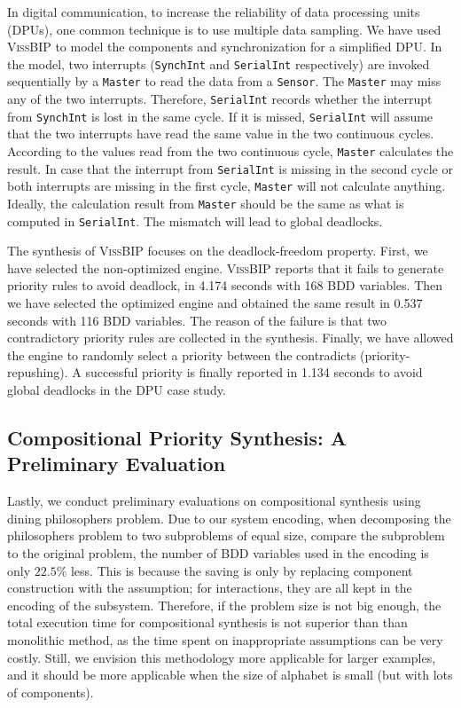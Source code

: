 \documentclass[10pt, a4paper, onecolumn, conference, compsocconf]{IEEEtran}
\begin{document}
In digital communication, to increase the reliability of data processing units (DPUs), one common technique is to use multiple data sampling.
We have used \textsc{VissBIP} to model the components and synchronization for a simplified DPU. In the model, two interrupts (\texttt{SynchInt} and \texttt{SerialInt} respectively) are invoked sequentially by a \texttt{Master} to read the data from a \texttt{Sensor}. The \texttt{Master} may miss any of the two interrupts. Therefore, \texttt{SerialInt} records whether the interrupt from \texttt{SynchInt} is lost in the same cycle. If it is missed, \texttt{SerialInt} will assume that the two interrupts have read the same value in the two continuous cycles. According to the values read from the two continuous cycle, \texttt{Master} calculates the result. In case that the interrupt from \texttt{SerialInt} is missing in the second cycle or both interrupts are missing in the first cycle, \texttt{Master} will not calculate anything. Ideally, the calculation result from \texttt{Master} should be the same as what is computed in \texttt{SerialInt}. The mismatch will lead to global deadlocks.

The synthesis of \textsc{VissBIP} focuses on the deadlock-freedom property. First, we have selected the non-optimized engine. \textsc{VissBIP} reports that it fails to generate priority rules to avoid deadlock, in 4.174 seconds with 168 BDD variables. Then we have selected the optimized engine and obtained the same result in 0.537 seconds with 116 BDD variables. The reason of the failure is that two contradictory priority rules are collected in the synthesis. Finally, we have allowed the engine to randomly select a priority between the contradicts (priority-repushing). A successful priority is finally reported in 1.134 seconds to avoid global deadlocks in the DPU case study.

\subsection{Compositional Priority Synthesis: A Preliminary Evaluation\label{appsub.algo.prioritysyn.compositional.evaluation}}

Lastly, we conduct preliminary evaluations on compositional synthesis using dining philosophers problem. Due to our system encoding, when decomposing the philosophers problem to two subproblems of equal size, compare the subproblem to the original problem, the number of BDD variables used in the encoding is only $22.5\%$ less. This is because the saving is only by replacing component construction with the assumption; for interactions, they are all kept in the encoding of the subsystem. Therefore, if the problem size is not big enough, the total execution time for compositional synthesis is not superior than than monolithic method, as the time spent on inappropriate assumptions can be very costly. Still, we envision this methodology more applicable for larger examples, and it should be more applicable when the size of alphabet is small (but with lots of components).
\end{document}
